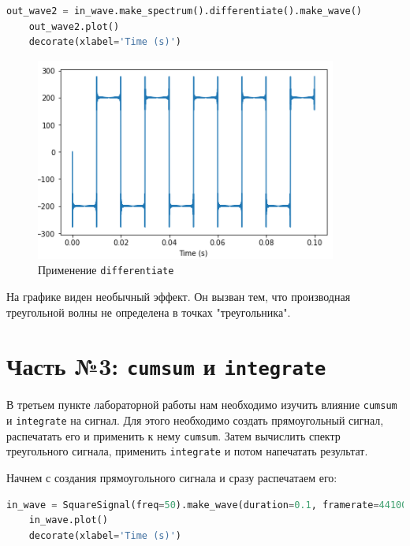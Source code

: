 \documentclass[a4paper]{article}
\begin{document}
\begin{lstlisting}[language=Python, caption= Вычисление спектра и применение \texttt{differentiate}]
    out_wave2 = in_wave.make_spectrum().differentiate().make_wave()
    out_wave2.plot()
    decorate(xlabel='Time (s)')
\end{lstlisting}
            
            \begin{figure}[H]
                \centering
                \includegraphics{ex_2_3.png}
                \caption{Применение \texttt{differentiate}}
                \label{fig:ex_2_3}
            \end{figure}
            
            На графике виден необычный эффект. Он вызван тем, что производная треугольной волны не определена в точках "треугольника".
            
    \newpage
        \section{Часть №3: \texttt{cumsum} и \texttt{integrate}}
            В третьем пункте лабораторной работы нам необходимо изучить влияние \texttt{cumsum} и \texttt{integrate} на сигнал. Для этого необходимо создать прямоугольный сигнал, распечатать его и применить к нему \texttt{cumsum}. Затем вычислить спектр треугольного сигнала, применить \texttt{integrate} и потом напечатать результат. 
            
            Начнем с создания прямоугольного сигнала и сразу распечатаем его:
            
\begin{lstlisting}[language=Python, caption= Создание и вывод прямоугольного сигнала]
    in_wave = SquareSignal(freq=50).make_wave(duration=0.1, framerate=44100)
    in_wave.plot()
    decorate(xlabel='Time (s)')
\end{lstlisting}
            
\end{document}
